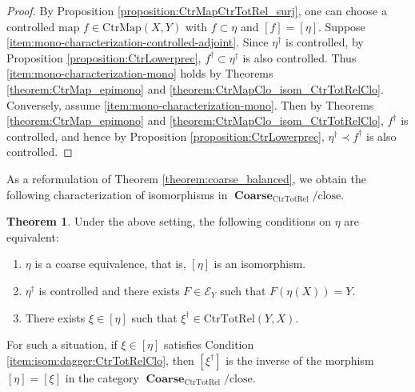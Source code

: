 \documentclass[12pt, a4paper]{amsart}
\theoremstyle{definition}
\newtheorem{theorem}{Theorem}[section]
\newcommand{\Coarse}{\mathop{\mathbf{Coarse}}\nolimits}
\newcommand{\CtrMap}{\mathrm{CtrMap}}
\newcommand{\CtrTotRel}{\mathrm{CtrTotRel}}
\newcommand{\close}{\mathrm{close}}
\begin{document}
\begin{proof}
By Proposition \ref{proposition:CtrMapCtrTotRel_surj}, 
one can choose a controlled map $f \in \CtrMap(X,Y)$ with $f \subset \eta$ and $[f] = [\eta]$.
Suppose 
\eqref{item:mono-characterization-controlled-adjoint}.
Since $\eta^\dagger$ is controlled, 
by Proposition \ref{proposition:CtrLowerprec}, 
$f^\dagger \subset \eta^\dagger$ is also controlled.
Thus \eqref{item:mono-characterization-mono} holds by 
Theorems \ref{theorem:CtrMap_epimono} and \ref{theorem:CtrMapClo_isom_CtrTotRelClo}.
Conversely, assume \eqref{item:mono-characterization-mono}.
Then by Theorems \ref{theorem:CtrMap_epimono} and \ref{theorem:CtrMapClo_isom_CtrTotRelClo}, $f^\dagger$ is controlled, 
and hence by Proposition \ref{proposition:CtrLowerprec}, $\eta^\dagger \prec f^\dagger$ is also controlled.
\end{proof}

As a reformulation of Theorem \ref{theorem:coarse_balanced},
we obtain the following characterization of isomorphisms in
$\Coarse_{\CtrTotRel}/\close$.


\begin{theorem}\label{theorem:CtrTotRelClo_isom}
Under the above setting, the following conditions on $\eta$ are equivalent:
\begin{enumerate}
    \item $\eta$ is a coarse equivalence, that is, 
    $[\eta]$ is an isomorphism.    
    \item $\eta^\dagger$ is controlled and there exists
    $F \in \mathcal{E}_Y$ such that
    $F(\eta(X)) = Y$.
    
    \item \label{item:isom:dagger:CtrTotRelClo}
    There exists $\xi \in [\eta]$ such that
    $\xi^\dagger \in \CtrTotRel(Y,X)$.
\end{enumerate}

For such a situation, if $\xi \in [\eta]$ satisfies
Condition \eqref{item:isom:dagger:CtrTotRelClo}, then
$[\xi^\dagger]$ is the inverse of the morphism
$[\eta]=[\xi]$ in the category
$\Coarse_{\CtrTotRel}/\close$.
\end{theorem}
\end{document}
